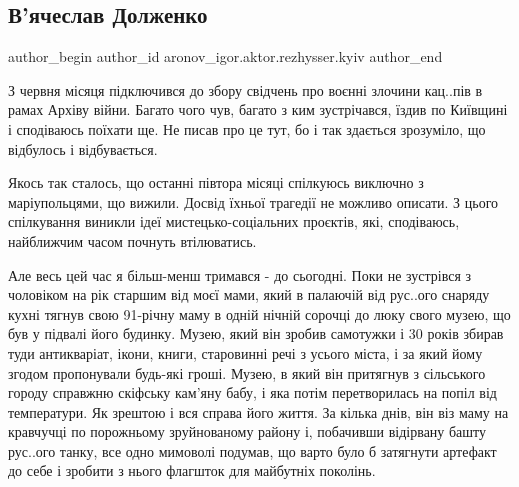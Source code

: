  
 
 
 
 

\subsection{В'ячеслав Долженко}
\label{sec:08_02_2023.fb.aronov_igor.aktor.rezhysser.kyiv.1.v_yacheslav_dolzhenk}

\ifcmt
 author_begin
   author_id aronov_igor.aktor.rezhysser.kyiv
 author_end
\fi

З червня місяця підключився до збору свідчень про воєнні злочини кац..пів в
рамах Архіву війни. Багато чого чув, багато з ким зустрічався, їздив по
Київщині і сподіваюсь поїхати ще. Не писав про це тут, бо і так здається
зрозуміло, що відбулось і відбувається.

Якось так сталось, що останні півтора місяці спілкуюсь виключно з
маріупольцями, що вижили. Досвід їхньої трагедії не можливо описати. З цього
спілкування виникли ідеї мистецько-соціальних проєктів, які, сподіваюсь,
найближчим часом почнуть втілюватись.

Але весь цей час я більш-менш тримався - до сьогодні. Поки не зустрівся з
чоловіком на рік старшим від моєї мами, який в палаючій від рус..ого снаряду
кухні тягнув свою 91-річну маму в одній нічній сорочці до люку свого музею, що
був у підвалі його будинку. Музею, який він зробив самотужки і 30 років збирав
туди антикваріат, ікони, книги, старовинні речі з усього міста, і за який йому
згодом пропонували будь-які гроші. Музею, в який він притягнув з сільського
городу справжню скіфську кам'яну бабу, і яка потім перетворилась на попіл від
температури. Як зрештою і вся справа його життя. За кілька днів, він віз маму
на кравчучці по порожньому зруйнованому району і, побачивши відірвану башту
рус..ого танку, все одно мимоволі подумав, що варто було б затягнути артефакт
до себе і зробити з нього флагшток для майбутніх поколінь. 

